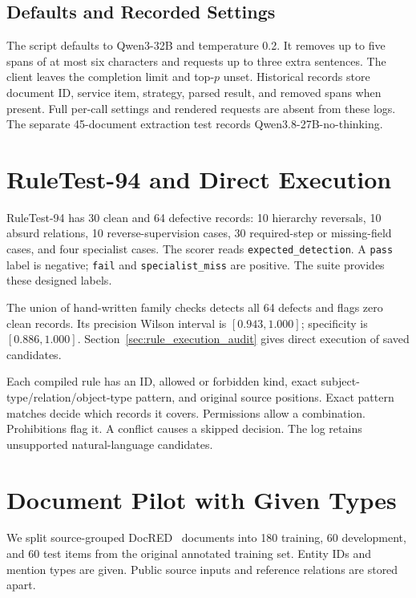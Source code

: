 \subsection{Defaults and Recorded Settings}

The script defaults to Qwen3-32B and temperature 0.2.
It removes up to five spans of at most six characters and requests
up to three extra sentences. The client leaves the completion limit
and top-$p$ unset. Historical records store document ID, service item,
strategy, parsed result, and removed spans when present.
Full per-call settings and rendered requests are absent from these logs.
The separate 45-document extraction test records Qwen3.8-27B-no-thinking.

\section{RuleTest-94 and Direct Execution}

\label{app:testset}

RuleTest-94 has 30 clean and 64 defective records: 10 hierarchy reversals,
10 absurd relations, 10 reverse-supervision cases, 30 required-step or
missing-field cases, and four specialist cases. The scorer reads
\texttt{expected\_detection}. A \texttt{pass} label is negative;
\texttt{fail} and \texttt{specialist\_miss} are positive.
The suite provides these designed labels.

The union of hand-written family checks detects all 64 defects and flags
zero clean records. Its precision Wilson interval is $[0.943,1.000]$;
specificity is $[0.886,1.000]$. Section~\ref{sec:rule_execution_audit}
gives direct execution of saved candidates.

\label{app:rule_format}

Each compiled rule has an ID, allowed or forbidden kind, exact
subject-type/relation/object-type pattern, and original source positions.
Exact pattern matches decide which records it covers.
Permissions allow a combination. Prohibitions flag it.
A conflict causes a skipped decision. The log retains unsupported
natural-language candidates.

\section{Document Pilot with Given Types}

\label{app:docred_pilot}

We split source-grouped DocRED~\cite{ref_docred} documents into 180 training,
60 development, and 60 test items from the original annotated training
set. Entity IDs and mention types are given. Public source inputs and
reference relations are stored apart.

